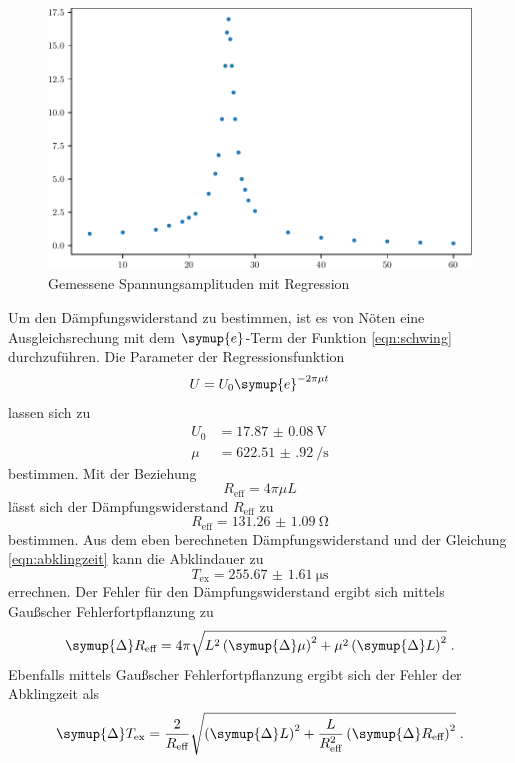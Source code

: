 \begin{figure}
    \centering
    \caption{Gemessene Spannungsamplituden mit Regression}
    \label{fig:voltage}
    \includegraphics{build/voltage.pdf}
\end{figure}
Um den Dämpfungswiderstand zu bestimmen, ist es von Nöten eine Ausgleichsrechung mit dem $\symup{e}$-Term der Funktion
\eqref{eqn:schwing} durchzuführen.
Die Parameter der Regressionsfunktion
\begin{equation}
    U = U_0 \symup{e}^{-2\pi\mu t}
\end{equation}
lassen sich zu
\begin{align*}
    U_0 &= \SI{17.87(8)}{\volt}\\
    \mu &= \SI{622.51(92)}{\per\second}
\end{align*}
bestimmen.
Mit der Beziehung 
\begin{equation}
    R_\text{eff} = 4\pi\mu L 
\end{equation}
lässt sich der Dämpfungswiderstand $R_\text{eff}$ zu
\begin{equation*}
    R_\text{eff} = \SI{131.26(109)}{\ohm}
\end{equation*}
bestimmen.
Aus dem eben berechneten Dämpfungswiderstand und der Gleichung \eqref{eqn:abklingzeit} kann die Abklindauer zu 
\begin{equation*}
    T_\text{ex} = \SI{255.67(161)}{\micro\second}
\end{equation*}
errechnen.
Der Fehler für den Dämpfungswiderstand ergibt sich mittels Gaußscher Fehlerfortpflanzung zu 
\begin{equation}
    \symup{\Delta} R_\text{eff} = 4\pi \sqrt{L^2 \left( \symup{\Delta} \mu \right)^2  + \mu^2 \left( \symup{\Delta} L \right)^2} \; \text{}.
\end{equation}
Ebenfalls mittels Gaußscher Fehlerfortpflanzung ergibt sich der Fehler der Abklingzeit als
\begin{equation}
    \symup{\Delta} T_\text{ex} = \frac{2}{R_\text{eff}} \sqrt{\left( \symup{\Delta} L \right)^2 + \frac{L}{R_\text{eff}^2} \left( \symup{\Delta} R_\text{eff}  \right)^2 } \; \text{.}
\end{equation}
